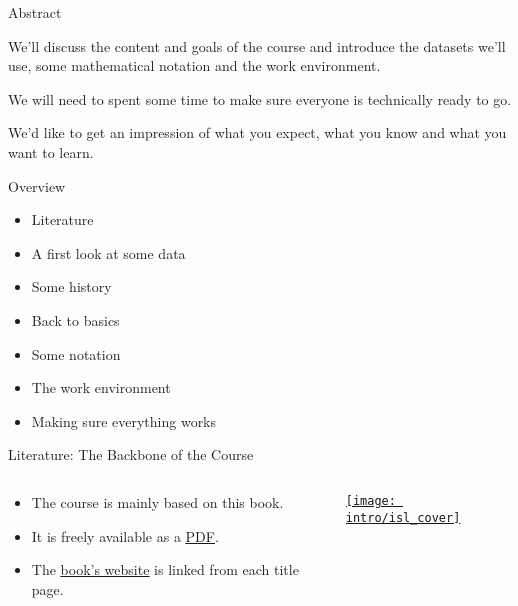 \documentclass[mathserif, aspectratio=169]{beamer}
\subtitle{\bfseries%
  {Introduction\\\it Course Overview \& Work Environment}\\%
  {\tiny\it course content \& goals, datasets, mathematical notation, bayesian basics, technicalities, getting ready}\\%
}
\begin{document}


\begin{frame}{Abstract}

	\begin{blurb}
			We'll discuss the content and goals of the course and introduce 
			the datasets we'll use, some mathematical notation and 
			the work environment.

			We will need to spent some time to make sure everyone is
			technically ready to go. 

			We'd like to get an impression of what you expect, what you know
			and what you want to learn.  
	\end{blurb}
\end{frame}

\begin{frame}{Overview}
	\begin{itemize}
		\item Literature
		\item A first look at some data
		\item Some history
		\item Back to basics  
		\item Some notation
		\item The work environment
		\item Making sure everything works
	\end{itemize}
\end{frame}

\begin{frame}{Literature: The Backbone of the Course}
	\begin{columns}
		\begin{column}{0.6\textwidth}
			\begin{itemize}
				\item The course is mainly based on this book.
				\item It is freely available as a
					\href{http://faculty.marshall.usc.edu/gareth-james/ISL/ISLR\%20Seventh\%20Printing.pdf}{\blue\underline{PDF}}.
				\item The \href{www.statlearning.com}{\blue\underline{book's website}} is linked from each title page.
			\end{itemize}
		\end{column}
		\begin{column}{0.4\textwidth}
			\begin{center}
				\href{www.statlearning.com}{\texttt{[image: intro/isl\_cover]}}
			\end{center}
		\end{column}
	\end{columns}
\end{frame}
\end{document}
